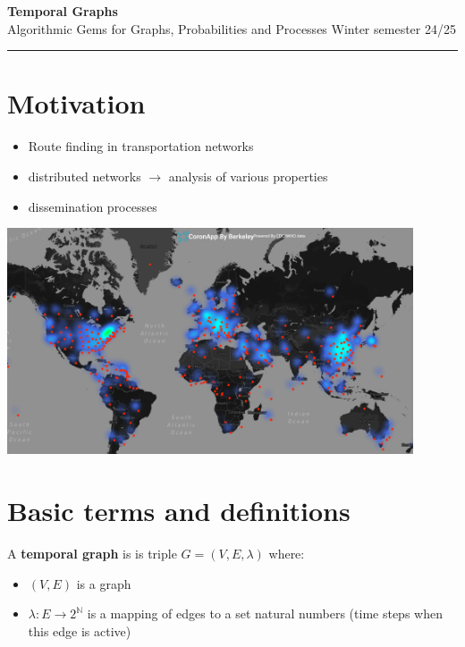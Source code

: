 \documentclass[11pt,a4paper]{article}
\begin{document}
\nocite{*}

\thispagestyle{empty}
\begin{center}
    {\huge \textbf{\color{primary} Temporal Graphs}} \\
    \vspace{0.4em}
    {\Large \color{secondary} Algorithmic Gems for Graphs, Probabilities and Processes Winter semester 24/25}
    \vspace{1em}
    \rule{\textwidth}{0.5pt}
\end{center}
\section{Motivation}
\begin{minipage}{0.6\textwidth}
\begin{itemize}
  \item Route finding in transportation networks
  \item distributed networks $\rightarrow$ analysis of various properties
  \item dissemination processes
\end{itemize}
\end{minipage}
\begin{minipage}{0.39\textwidth}
  \includegraphics[width=0.9\textwidth]{media/corona.png}
\end{minipage}


\section{Basic terms and definitions}

\begin{tcolorbox}[title=Definition temporal graph]
  A \textbf{temporal graph} \cite[page 243]{Michail2015} is is triple \( G = (V, E, \lambda) \) where:
  \begin{itemize}
        \item \( (V, E) \) is a graph
        \item $ \lambda: E \rightarrow 2^{\mathbb{N}}$ is a mapping of edges to a set natural numbers (time steps when this edge is active)
      \end{itemize}
\end{tcolorbox}
\end{document}
